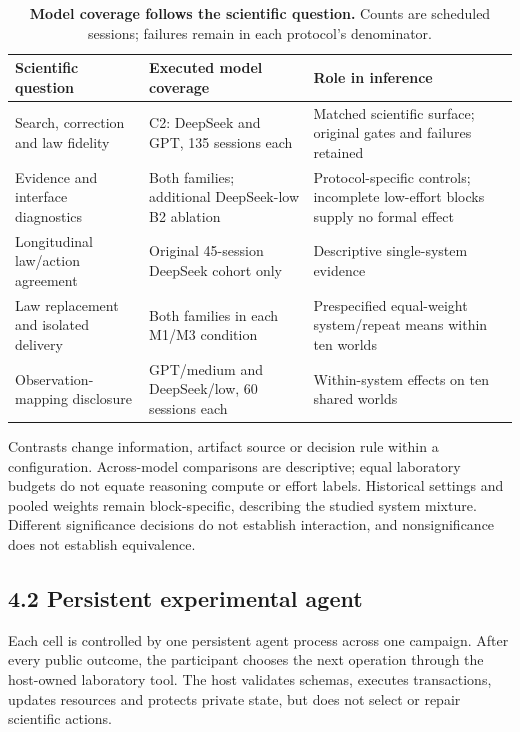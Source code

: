 \documentclass[10pt,twocolumn]{article}
\begin{document}
\begin{table}[t]
\centering
\caption{\textbf{Model coverage follows the scientific question.} Counts are scheduled sessions; failures remain in each protocol's denominator.}
\label{tab:model-coverage}
\small
\renewcommand{\arraystretch}{1.1}
\begin{tabularx}{\textwidth}{@{}>{\raggedright\arraybackslash}p{}>{\raggedright\arraybackslash}p{}Y@{}}
\toprule
Scientific question & Executed model coverage & Role in inference \\
\midrule
Search, correction and law fidelity & C2: DeepSeek and GPT, 135 sessions each & Matched scientific surface; original gates and failures retained \\
Evidence and interface diagnostics & Both families; additional DeepSeek-low B2 ablation & Protocol-specific controls; incomplete low-effort blocks supply no formal effect \\
Longitudinal law/action agreement & Original 45-session DeepSeek cohort only & Descriptive single-system evidence \\
Law replacement and isolated delivery & Both families in each M1/M3 condition & Prespecified equal-weight system/repeat means within ten worlds \\
Observation-mapping disclosure & GPT/medium and DeepSeek/low, 60 sessions each & Within-system effects on ten shared worlds \\
\bottomrule
\end{tabularx}
\end{table}

Contrasts change information, artifact source or decision rule within a
configuration. Across-model comparisons are descriptive; equal
laboratory budgets do not equate reasoning compute or effort labels.
Historical settings and pooled weights remain block-specific, describing
the studied system mixture. Different significance decisions do not
establish interaction, and nonsignificance does not establish
equivalence.

\subsection{4.2 Persistent experimental
agent}\label{persistent-experimental-agent}

Each cell is controlled by one persistent agent process across one
campaign. After every public outcome, the participant chooses the next
operation through the host-owned laboratory tool. The host validates
schemas, executes transactions, updates resources and protects private
state, but does not select or repair scientific actions.
\end{document}
